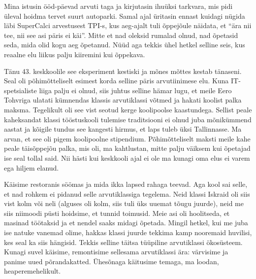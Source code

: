 Mina istusin ööd-päevad arvuti taga ja kirjutasin 
ihuüksi tarkvara, mis pidi 
üleval hoidma tervet suurt autoparki. Samal ajal üritasin ennast kuidagi nügida 
läbi SuperCalci arvestusest TPI-s, 
kus 
aeg-ajalt tuli õppejõule näidata, et \enquote{ära nii tee, nii see asi päris ei 
käi}. 
Mitte et nad oleksid rumalad olnud, nad õpetasid seda, mida olid kogu 
aeg õpetanud. Nüüd aga tekkis ühel hetkel selline seis, kus reaalne elu liikus 
palju kiiremini kui õppekava.


Tänu 43. keskkoolile see eksperiment kestiski ja mõnes mõttes kestab tänaseni. 
Seal oli 
põhimõtteliselt esimest korda selline päris arvutiinimese elu. Kuna 
IT-spetsialiste liiga palju ei olnud, siis juhtus selline hämar lugu, et meile 
Eero Tohvriga ulatati kümnendas klassis arvutiklassi 
võtmed ja hakati 
koolist palka maksma. Tegelikult oli see vist seotud 
kerge koolipoolse kaastundega. Sellist peale 
kaheksandat klassi tööstuskooli tulemise traditsiooni ei olnud juba mõnikümmend 
aastat ja kõigile tundus see kangesti hirmus, et laps tuleb üksi Tallinnasse. 
Ma arvan, et see oli pigem koolipoolne stipendium. 
Põhimõtteliselt maksti meile kahe peale täisõppejõu palka, mis 
oli, ma kahtlustan, mitte palju väiksem kui õpetajad 
ise seal tollal said. Nii hästi kui keskkooli ajal ei ole ma kunagi oma elus ei 
varem ega 
hiljem elanud. 


Käisime restoranis söömas ja mida ikka lapsed rahaga teevad. Aga kool sai 
selle, et nad rohkem ei pidanud selle arvutiklassiga tegelema. Neid klassi  
Iskraid 
oli 
siis vist kolm või neli (alguses oli kolm, siis tuli üks uuemat tõugu juurde), 
neid me siis niimoodi püsti hoidsime, et tunnid toimusid. Meie asi 
oli hoolitseda, et masinad töötaksid ja et nendel saaks midagi õpetada. Mingil 
hetkel, kui me juba ise natuke vanemad olime, hakkas klassi juurde tekkima 
kamp nooremaid huvilisi, kes seal ka siis hängisid. Tekkis selline 
täitsa tüüpiline arvutiklassi ökosüsteem. Kunagi suvel käisime, remontisime 
sellesama 
arvutiklassi ära: värvisime ja panime uued põrandakatted. Ühesõnaga käitusime 
temaga, 
ma loodan, heaperemehelikult. 

